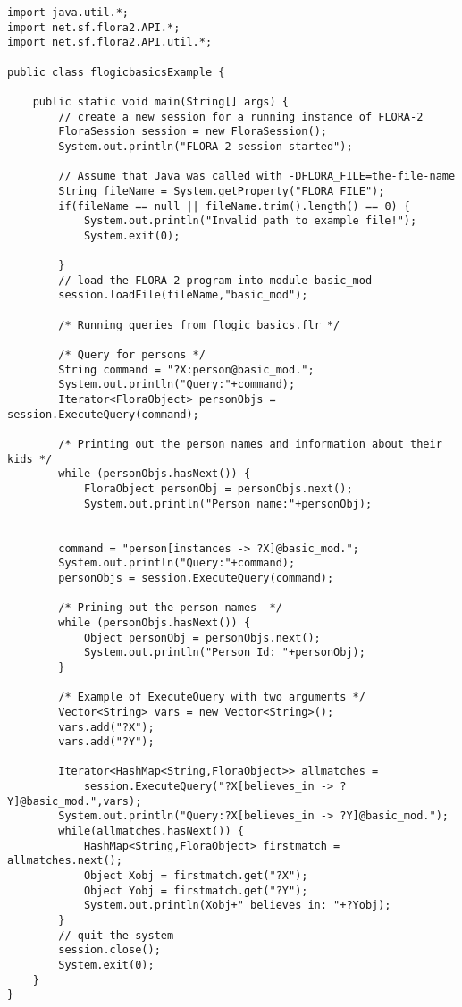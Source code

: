 \begin{verbatim}
import java.util.*;
import net.sf.flora2.API.*;
import net.sf.flora2.API.util.*;

public class flogicbasicsExample {

    public static void main(String[] args) {
        // create a new session for a running instance of FLORA-2
        FloraSession session = new FloraSession();
        System.out.println("FLORA-2 session started");

        // Assume that Java was called with -DFLORA_FILE=the-file-name
        String fileName = System.getProperty("FLORA_FILE");
        if(fileName == null || fileName.trim().length() == 0) {
            System.out.println("Invalid path to example file!");
            System.exit(0);

        }
        // load the FLORA-2 program into module basic_mod
        session.loadFile(fileName,"basic_mod");

        /* Running queries from flogic_basics.flr */

        /* Query for persons */
        String command = "?X:person@basic_mod.";
        System.out.println("Query:"+command);
        Iterator<FloraObject> personObjs = session.ExecuteQuery(command);

        /* Printing out the person names and information about their kids */
        while (personObjs.hasNext()) {
            FloraObject personObj = personObjs.next();
            System.out.println("Person name:"+personObj);


        command = "person[instances -> ?X]@basic_mod.";
        System.out.println("Query:"+command);
        personObjs = session.ExecuteQuery(command);

        /* Prining out the person names  */
        while (personObjs.hasNext()) {
            Object personObj = personObjs.next();
            System.out.println("Person Id: "+personObj);
        }

        /* Example of ExecuteQuery with two arguments */
        Vector<String> vars = new Vector<String>();
        vars.add("?X");
        vars.add("?Y");

        Iterator<HashMap<String,FloraObject>> allmatches =
            session.ExecuteQuery("?X[believes_in -> ?Y]@basic_mod.",vars);
        System.out.println("Query:?X[believes_in -> ?Y]@basic_mod.");
        while(allmatches.hasNext()) {
            HashMap<String,FloraObject> firstmatch = allmatches.next();
            Object Xobj = firstmatch.get("?X");
            Object Yobj = firstmatch.get("?Y");
            System.out.println(Xobj+" believes in: "+?Yobj);
        }
        // quit the system
        session.close();
        System.exit(0);
    }
}
\end{verbatim}


